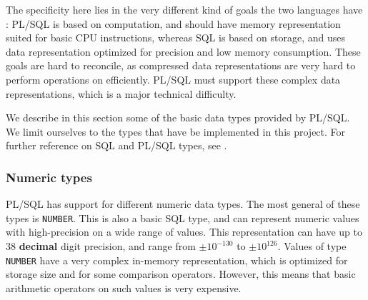 \documentclass[twoside,11pt,a4paper]{article}
\newcommand{\pls}[1]{\texttt{#1}}
\newcommand{\plstype}[1]{\pls{#1}}
\newcommand{\oranum}{\plstype{NUMBER}}
\newcommand{\plsi}{\plstype{PLS\_INTEGER}}
\begin{document}

The specificity here lies in the very different kind of goals the two languages have : PL/SQL is based on computation, and should have memory representation suited for basic CPU instructions, whereas SQL is based on storage, and uses data representation optimized for precision and low memory consumption. These goals are hard to reconcile, as compressed data representations are very hard to perform operations on efficiently. PL/SQL must support these complex data representations, which is a major technical difficulty.


We describe in this section some of the basic data types provided by PL/SQL. We limit ourselves to the types that have be implemented in this project. For further reference on SQL and PL/SQL types, see \cite{plsdoc, sqldoc}.

\subsubsection{Numeric types}

\label{sec:numerictypes}

PL/SQL has support for different numeric data types. The most general of these types is \oranum{}. This is also a basic SQL type, and can represent numeric values with high-precision on a wide range of values. This representation can have up to 38 \textbf{decimal} digit precision, and range from $ \pm 10^{-130}$ to $\pm 10^{126}$. Values of type \oranum{} have a very complex in-memory representation, which is optimized for storage size and for some comparison operators. However, this means that basic arithmetic operators on such values is very expensive.

 
\end{document}
